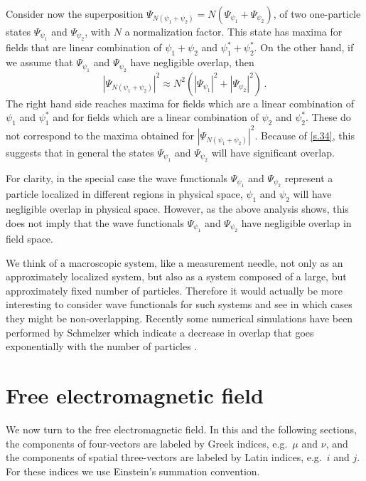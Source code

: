 \documentclass[12pt]{article}
\begin{document}
Consider now the superposition $\Psi_{N(\psi_1 + \psi_2)}=N\left( \Psi_{\psi_1} + \Psi_{\psi_2}\right)$, of two one-particle states $\Psi_{\psi_1}$ and $\Psi_{\psi_2}$, with $N$ a normalization factor. This state has maxima for fields that are linear combination of $\psi_1 + \psi_2$ and $\psi^*_1 + \psi^*_2$. On the other hand, if we assume that $\Psi_{\psi_1}$ and $\Psi_{\psi_2}$ have negligible overlap, then
\begin{equation}
|\Psi_{N(\psi_1 + \psi_2)}|^2 \approx N^2 \left( |\Psi_{\psi_1}|^2 + |\Psi_{\psi_2}|^2 \right) \,.
\label{s.34}
\end{equation}
The right hand side reaches maxima for fields which are a linear combination of $\psi_1$ and $\psi^*_1$ and for fields which are a linear combination of $\psi_2$ and $\psi^*_2$. These do not correspond to the maxima obtained for $|\Psi_{N(\psi_1 + \psi_2)}|^2$. Because of \eqref {s.34}, this suggests that in general the states $\Psi_{\psi_1}$ and $\Psi_{\psi_2}$ will have significant overlap. 

For clarity, in the special case the wave functionals $\Psi_{\psi_1}$ and $\Psi_{\psi_2}$ represent a particle localized in different regions in physical space, $\psi_1$ and $\psi_2$ will have negligible overlap in physical space. However, as the above analysis shows, this does not imply that the wave functionals $\Psi_{\psi_1}$ and $\Psi_{\psi_2}$ have negligible overlap in field space.

We think of a macroscopic system, like a measurement needle, not only as an approximately localized system, but also as a system composed of a large, but approximately fixed number of particles. Therefore it would actually be more interesting to consider wave functionals for such systems and see in which cases they might be non-overlapping. Recently some numerical simulations have been performed by Schmelzer which indicate a decrease in overlap that goes exponentially with the number of particles \cite{schmelzer10}.



 



\section{Free electromagnetic field}\label{freeemfield}
We now turn to the free electromagnetic field. In this and the following sections, the components of four-vectors are labeled by Greek indices, e.g.\  $\mu$ and $\nu$, and the components of spatial three-vectors are labeled by Latin indices, e.g.\  $i$ and $j$. For these indices we use Einstein's summation convention.
\end{document}
